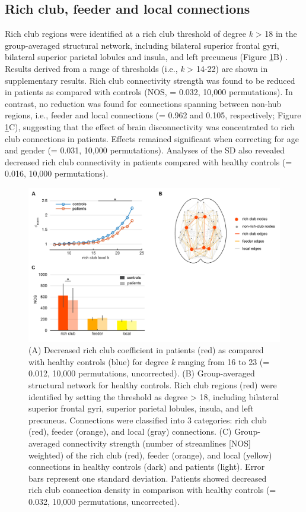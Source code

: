 \begin{refsection}
\subsection*{Rich club, feeder and local connections}
Rich club regions were identified at a rich club threshold of degree \textit{k} > 18 in the group-averaged structural network, including bilateral superior frontal gyri, bilateral superior parietal lobules and insula, and left precuneus (Figure \ref{rcsczFig1}B) \citep{vanDenHeuvel2011RichclubOO,vanDenHeuvel2013AbnormalRC}. Results derived from a range of thresholds (i.e., \textit{k} > 14-22) are shown in supplementary results. Rich club connectivity strength was found to be reduced in patients as compared with controls (NOS, \pval = 0.032, 10,000 permutations). In contrast, no reduction was found for connections spanning between non-hub regions, i.e., feeder and local connections (\pval = 0.962 and 0.105, respectively; Figure \ref{rcsczFig1}C), suggesting that the effect of brain disconnectivity was concentrated to rich club connections in patients. Effects remained significant when correcting for age and gender (\pval = 0.031, 10,000 permutations). Analyses of the SD also revealed decreased rich club connectivity in patients compared with healthy controls (\pval = 0.016, 10,000 permutations).

\begin{figure}[h]
\centering
  \includegraphics[width=\linewidth]{images/rcsczFig1.jpg}
  \caption{(A) Decreased rich club coefficient in patients (red) as compared with healthy controls (blue) for degree \textit{k} ranging from 16 to 23 (\pval = 0.012, 10,000 permutations, uncorrected). (B) Group-averaged structural network for healthy controls. Rich club regions (red) were identified by setting the threshold as degree > 18, including bilateral superior frontal gyri, superior parietal lobules, insula, and left precuneus. Connections were classified into 3 categories: rich club (red), feeder (orange), and local (gray) connections. (C) Group-averaged connectivity strength (number of streamlines [NOS] weighted) of the rich club (red), feeder (orange), and local (yellow) connections in healthy controls (dark) and patients (light). Error bars represent one standard deviation. Patients showed decreased rich club connection density in comparison with healthy controls (\pval = 0.032, 10,000 permutations, uncorrected).
}
  \label{rcsczFig1}
\end{figure}


\end{refsection}
